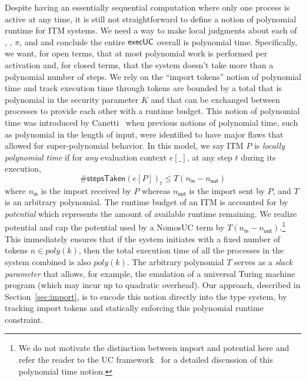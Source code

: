 Despite having an essentially sequential computation where only one process is active at any time,
it is still not straightforward to define a notion of polynomial runtime for ITM systems.
We need a way to make local judgments about each of \A, \Z, $\pi$, and \F and conclude the entire ${\mathsf {execUC}}$ overall is polynomial time. 
Specifically, we want, for open terms, that at most polynomial work is performed per activation and, for closed terms, that the system doesn't take more than a polynomial number of steps.
We rely on the ``import tokens'' notion of polynomial time and track execution time through tokens
are bounded by a total that is polynomial in the security parameter $K$ and that can be exchanged between processes to provide each other with a runtime budget.
This notion of polynomial time was introduced by Canetti~\cite{canettiUC} when previous notions of polynomial time, such as polynomial in the length of input, were identified to have major flaws that allowed for super-polynomial behavior.
In this model, we say ITM $P$ is \emph{locally polynomial time} if for \emph{any} evaluation context $e[\_]$, at any step $t$ during its execution,
\[
\#\textsf{stepsTaken}(e[P])_{t} \le T(n_{\textsf{in}} - n_{\textsf{out}})
\]
where $n_{\textsf{in}}$ is the import received by $P$ whereas $n_{\textsf{out}}$ is the import sent by $P$, and $T$ is an arbitrary polynomial.
The runtime budget of an ITM is accounted for by \emph{potential} which represents the amount of available runtime remaining.
We realize potential and cap the potential used by a NomosUC term by $T(n_\textsf{in}-n_\textsf{out})$.\footnote{We do not motivate the distinction between import and potential here and refer the reader to the UC framework~\cite{canettiUC} for a detailed discussion of this polynomial time notion.}
This immediately ensures that if the system initiates with a fixed number of tokens $n \in poly(k)$, then the total execution time
of all the processes in the system combined is also $poly(k)$.
The arbitrary polynomial $T$ serves as a \emph{slack parameter} that allows, for example,
the emulation of a universal Turing machine program (which may incur up to quadratic overhead).
Our approach, described in Section~\ref{sec:import}, is to encode this notion directly into the type system, by tracking import tokens and statically enforcing this polynomial runtime constraint.

